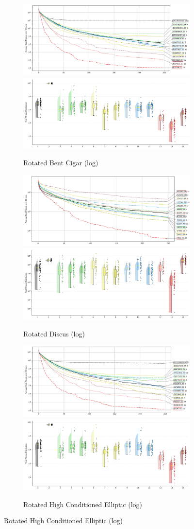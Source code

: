 \begin{figure}[p]
\begin{subfigure}{1\textwidth}
    \centering
    \includegraphics[width=.49\textwidth]{Figures/results/1000/Rotated_Bent_Cigar_All_selected_algorithms_dim1000_annot_legend.png}
    \includegraphics[width=.49\textwidth]{Figures/results/1000/Rotated_Bent_Cigar_all_dim1000_raincloud_vertical.png}
    \caption{Rotated Bent Cigar (log)}
\end{subfigure}

\begin{subfigure}{1\textwidth}
    \centering
    \includegraphics[width=.49\textwidth]{Figures/results/1000/Rotated_Discus_All_selected_algorithms_dim1000_annot_legend.png}
    \includegraphics[width=.49\textwidth]{Figures/results/1000/Rotated_Discus_all_dim1000_raincloud_vertical.png}
    \caption{Rotated Discus (log)}
\end{subfigure}

\begin{subfigure}{1\textwidth}
    \centering
    \includegraphics[width=.49\textwidth]{Figures/results/1000/Rotated_High_Conditioned_Elliptic_All_selected_algorithms_dim1000_annot_legend.png}
    \includegraphics[width=.49\textwidth]{Figures/results/1000/Rotated_High_Conditioned_Elliptic_all_dim1000_raincloud_vertical.png}
    \caption{Rotated High Conditioned Elliptic (log)}
\end{subfigure}


\end{figure}
